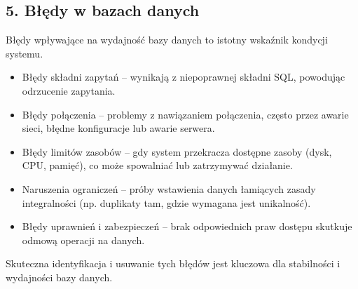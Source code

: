 \documentclass[a4paper,11pt,polish]{sphinxmanual}
\begin{document}
\subsection{5. Błędy w bazach danych}
\label{\detokenize{Wydajnosc-Skalowanie-i-Replikacja/index:bledy-w-bazach-danych}}
\sphinxAtStartPar
Błędy wpływające na wydajność bazy danych to istotny wskaźnik kondycji systemu.
\begin{description}
\begin{itemize}
\item {} 
\sphinxAtStartPar
Błędy składni zapytań – wynikają z niepoprawnej składni SQL, powodując odrzucenie zapytania.

\item {} 
\sphinxAtStartPar
Błędy połączenia – problemy z nawiązaniem połączenia, często przez awarie sieci, błędne konfiguracje lub awarie serwera.

\item {} 
\sphinxAtStartPar
Błędy limitów zasobów – gdy system przekracza dostępne zasoby (dysk, CPU, pamięć), co może spowalniać lub zatrzymywać działanie.

\item {} 
\sphinxAtStartPar
Naruszenia ograniczeń – próby wstawienia danych łamiących zasady integralności (np. duplikaty tam, gdzie wymagana jest unikalność).

\item {} 
\sphinxAtStartPar
Błędy uprawnień i zabezpieczeń – brak odpowiednich praw dostępu skutkuje odmową operacji na danych.

\end{itemize}

\sphinxAtStartPar
Skuteczna identyfikacja i usuwanie tych błędów jest kluczowa dla stabilności i wydajności bazy danych.

\end{description}
\end{document}
